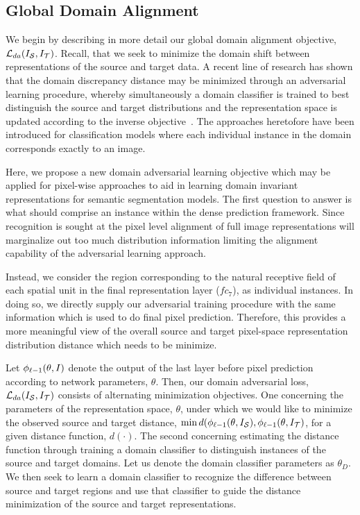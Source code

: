 \documentclass[10pt,twocolumn,letterpaper]{article}
\begin{document}
\subsection{Global Domain Alignment}\label{sec:global}

We begin by describing in more detail our global domain alignment objective, $\mathcal{L}_{da}({I}_{\mathcal{S}}, {I}_{\mathcal{T}})$. 
Recall, that we seek to minimize the domain shift between representations of the source and target data. 
A recent line of research has shown that the domain discrepancy distance may be minimized through an adversarial learning procedure, whereby simultaneously a domain classifier is trained to best distinguish the source and target distributions and the representation space is updated according to the inverse objective~\cite{tzeng2015simultaneous,chen2016synthesizing,ganin2016domain}. The approaches heretofore have been introduced for classification models where each individual instance in the domain corresponds exactly to an image. 

Here, we propose a new domain adversarial learning objective which may be applied for pixel-wise approaches to aid in learning domain invariant representations for semantic segmentation models. The first question to answer is what should comprise an instance within the dense prediction framework. Since recognition is sought at the pixel level alignment of full image representations will marginalize out too much distribution information limiting the alignment capability of the adversarial learning approach. 

Instead, we consider the region corresponding to the natural receptive field of each spatial unit in the final representation layer (\eg $fc_7$),  as individual instances. 
In doing so, we directly supply our adversarial training procedure with the same information which is used to do final pixel prediction. Therefore, this provides a more meaningful view of the overall source and target pixel-space representation distribution distance which needs to be minimize. 


Let $\phi_{\ell-1}(\theta, {I})$ denote the output of the last layer before pixel prediction according to network parameters, $\theta$. 
Then, our domain adversarial loss, $\mathcal{L}_{da}({I}_{\mathcal{S}}, {I}_{\mathcal{T}})$ consists of alternating minimization objectives. One concerning the parameters of the representation space, $\theta$, under which we would like to minimize the observed source and target distance, $\min d(\phi_{\ell-1}(\theta,{I}_{\mathcal{S}}), \phi_{\ell-1}(\theta,{I}_{\mathcal{T}})$, for a given distance function, $d(\cdot)$. The second concerning estimating the distance function through training a domain classifier to distinguish instances of the source and target domains. Let us denote the domain classifier parameters as $\theta_D$. 
We then seek to learn a domain classifier to recognize the difference between source and target regions and use that classifier to guide the distance minimization of the source and target representations. 
 
\end{document}
